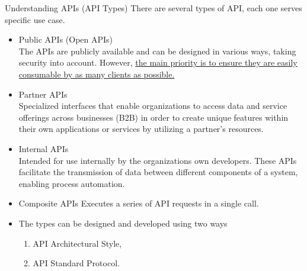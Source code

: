 \documentclass{beamer}
\begin{document}
\begin{frame}[t]{Understanding APIs \small (API Types)}
  There are several types of API, each one serves specific use case.
  
  \begin{itemize}
  	\item<1-> Public APIs (Open APIs) \\
  	\tiny{ The APIs are publicly available and can be designed in various ways, taking security into account. However, \underline{the main priority is to ensure they are easily consumable by as many clients as possible. }}

  	\item<2-> \small Partner APIs \\
  	\tiny{ Specialized interfaces that enable organizations to access data and service offerings across businesses (B2B) in order to create unique features within their own applications or services by utilizing a partner's resources. }
  	
  	\item<3-> \small Internal APIs \\
  	 \tiny{ Intended for use internally by the organizations own developers. These APIs facilitate the transmission of data between different components of a system, enabling process automation. }
  	 
  	\item<4-> \small Composite APIs  {\tiny Executes a series of API requests in a single call.}
  	\vspace{3mm}
    \item<5->[] The types can be designed and developed using two ways \\
    \begin{enumerate}
     \item API Architectural Style, 
     \item API Standard Protocol.  
    \end{enumerate}    
  \end{itemize}   
  
  
\end{frame}
\end{document}
